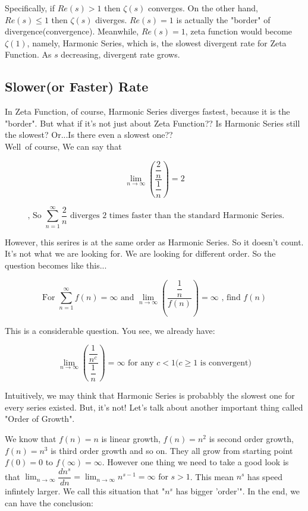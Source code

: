 \documentclass{article}
\begin{document}
  Specifically, if $Re(s) > 1$ then $\zeta(s)$ converges. On the other hand, $Re(s) \leq 1$ then $\zeta(s)$ diverges. $Re(s) = 1$ is actually the "border" of divergence(convergence). Meanwhile, $Re(s) = 1$, zeta function would become $\zeta(1)$, namely, Harmonic Series, which is, the slowest divergent rate for Zeta Function. As $s$ decreasing, divergent rate grows. \\

  \subsection{Slower(or Faster) Rate}
  In Zeta Function, of course, Harmonic Series diverges fastest, because it is the "border". But what if it's not just about Zeta Function?? Is Harmonic Series still the slowest? Or...Is there even a slowest one?? \\

  Well~of course, We can say that 

  \[
	  \displaystyle \lim_{n \to \infty} \left( \dfrac{\dfrac{2}{n}}{\dfrac{1}{n}} \right) = 2 
  \]

  \[
	  \text{ , So } \sum_{n=1}^{\infty}\dfrac{2}{n} \text{ diverges 2 times faster than the standard Harmonic Series.}
  \]

  However, this serires is at the same order as Harmonic Series. So it doesn't count. It's not what we are looking for. We are looking for different order. So the question becomes like this... 

  \[
	  \text{For }\displaystyle \sum_{n=1}^{\infty} f(n) = \infty \text{ and } \lim_{n \to \infty} \left( \dfrac{\dfrac{1}{n}}{f(n)} \right) = \infty \text{ , find } f(n) 
  \]

  This is a considerable question. You see, we already have:

  \[
	  \displaystyle \lim_{n \to \infty} \left( \dfrac{\dfrac{1}{n^c}}{\dfrac{1}{n}} \right) = \infty \text{ for any } c<1 \text{(} c\geq1 \text{ is convergent)}
  \]

  Intuitively, we may think that Harmonic Series is probabbly the slowest one for every series existed. But, it's not! Let's talk about another important thing called "Order of Growth".

  We know that $f(n) = n$ is linear growth, $f(n) = n^2$ is second order growth, $f(n) = n^3$ is third order growth and so on. They all grow from starting point $f(0) = 0$ to $f(\infty) = \infty$. However one thing we need to take a good look is that $\displaystyle \lim_{n \to \infty} \dfrac{dn^{s}}{dn} = \lim_{n \to \infty} n^{s-1}  = \infty \text{ for } s>1$. This mean $n^s$ has speed infintely larger.  We call this situation that "$n^{s}$ has bigger 'order'". In the end, we can have the conclusion:
\end{document}
